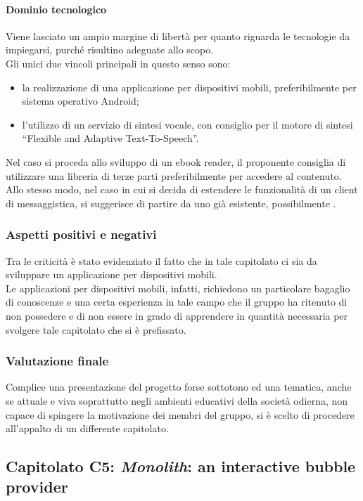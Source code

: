			\paragraph{Dominio tecnologico}
			Viene lasciato un ampio margine di libertà per quanto riguarda le tecnologie da impiegarsi, purché risultino adeguate allo scopo. 
			\\Gli unici due vincoli principali in questo senso sono:
			\begin{itemize}
			\item la realizzazione di una applicazione per dispositivi mobili, preferibilmente per sistema operativo Android;
			\item l'utilizzo di un servizio di sintesi vocale, con consiglio per il motore di sintesi “Flexible and Adaptive Text-To-Speech”.
			\end{itemize}
			Nel caso si proceda allo sviluppo di un ebook reader, il proponente consiglia di utilizzare una libreria di terze parti preferibilmente 
			 per accedere al contenuto. Allo stesso modo, nel caso in cui si decida di estendere le funzionalità di un client di messaggistica, 
			si suggerisce di partire da uno già esistente, possibilmente .
		\subsubsection{Aspetti positivi e negativi}
		Tra le criticità è stato evidenziato il fatto che in tale capitolato ci sia da sviluppare un applicazione per dispositivi mobili.
		\\Le applicazioni per dispositivi mobili, infatti, richiedono un particolare bagaglio di conoscenze e una certa esperienza in tale campo che
		il gruppo ha ritenuto di non possedere e di non essere in grado di apprendere in quantità necessaria per svolgere tale capitolato che si è prefissato.
		
		\subsubsection{Valutazione finale}
		Complice una presentazione del progetto forse sottotono ed una tematica, anche se attuale e viva soprattutto negli ambienti 
		educativi della società odierna, non capace di spingere la motivazione dei membri del gruppo, si è scelto di procedere all'appalto di un 
		differente capitolato.
		
	\subsection{Capitolato C5: \emph{Monolith}: an interactive bubble provider}
